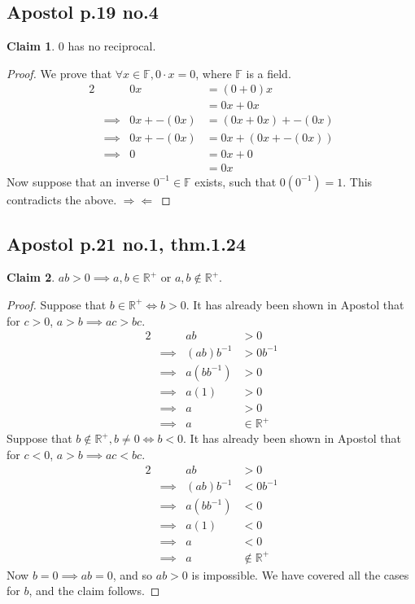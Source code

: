 \documentclass[12pt,letterpaper]{article}
\theoremstyle{definition}
\newtheorem*{claim}{Claim}
\newcommand{\contra}{\Rightarrow\!\Leftarrow}
\newcommand{\R}{\mathbb{R}}
\newcommand{\F}{\mathbb{F}}
\begin{document}
\subsection*{Apostol p.19 no.4}
\begin{claim}
    $0$ has no reciprocal.
\end{claim}

\begin{proof}
    We prove that $\forall x \in \F, 0 \cdot x = 0$, where $\F$ is a field.
    \begin{alignat*}{2}
        &&0x &= (0 + 0)x \\
        && &= 0x + 0x \\
        &\implies& 0x + -(0x) &= (0x + 0x) + -(0x) \\
        &\implies& 0x + -(0x) &= 0x + (0x + -(0x)) \\
        &\implies& 0 &= 0x + 0 \\
        && &= 0x
    \end{alignat*}
    Now suppose that an inverse $0^{-1} \in \F$ exists, such that $0(0^{-1}) = 1$.
    This contradicts the above. $\contra$
\end{proof}

\subsection*{Apostol p.21 no.1, thm.1.24}

\begin{claim}
    $ab > 0 \implies a,b \in \R^+$ or $a,b \notin \R^+$.
\end{claim}

\begin{proof}
    Suppose that $b \in \R^+ \iff b > 0$.
    It has already been shown in Apostol that for $c > 0$, $a > b \implies ac > bc$.
    \begin{alignat*}{2}
        && ab &> 0 \\
        &\implies& (ab)b^{-1} &> 0b^{-1} \\
        &\implies& a(bb^{-1}) &> 0 \\
        &\implies& a(1) &> 0 \\
        &\implies& a &> 0 \\
        &\implies& a &\in \R^+
    \end{alignat*}
    Suppose that $b \notin \R^+, b \neq 0 \iff b < 0$.
    It has already been shown in Apostol that for $c < 0$, $a > b \implies ac < bc$.
    \begin{alignat*}{2}
        && ab &> 0 \\
        &\implies& (ab)b^{-1} &< 0b^{-1} \\
        &\implies& a(bb^{-1}) &< 0 \\
        &\implies& a(1) &< 0 \\
        &\implies& a &< 0 \\
        &\implies& a &\notin \R^+
    \end{alignat*}
    Now $b = 0 \implies ab = 0$, and so $ab > 0$ is impossible. 
    We have covered all the cases for $b$, and the claim follows.
\end{proof}
\end{document}
